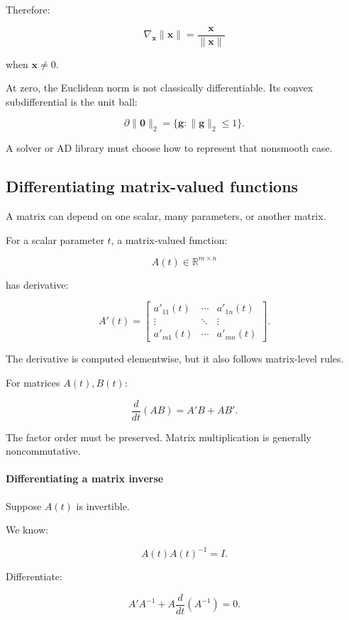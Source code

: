 Therefore:

\[
\boxed{ \nabla_{\mathbf x}\|\mathbf x\| = \frac{\mathbf x}{\|\mathbf x\|} }
\]

when \(\mathbf x\ne0\).

At zero, the Euclidean norm is not classically differentiable. Its convex subdifferential is the unit ball:

\[
\partial\|\mathbf0\|_2= \{\mathbf g:\|\mathbf g\|_2\le1\}.
\]

A solver or AD library must choose how to represent that nonsmooth case.

\subsection{Differentiating matrix-valued functions}\label{02-foundations-ii-ch027-differentiating-matrix-valued-functions}

A matrix can depend on one scalar, many parameters, or another matrix.

For a scalar parameter \(t\), a matrix-valued function:

\[
A(t)\in\mathbb R^{m\times n}
\]

has derivative:

\[
\boxed{ A'(t)= \begin{bmatrix} a'_{11}(t)&\cdots&a'_{1n}(t)\\ \vdots&\ddots&\vdots\\ a'_{m1}(t)&\cdots&a'_{mn}(t) \end{bmatrix} }.
\]

The derivative is computed elementwise, but it also follows matrix-level rules.

For matrices \(A(t),B(t)\):

\[
\boxed{ \frac d{dt}(AB)=A'B+AB' }.
\]

The factor order must be preserved. Matrix multiplication is generally noncommutative.

\paragraph{Differentiating a matrix inverse}\label{02-foundations-ii-ch027-differentiating-a-matrix-inverse}

Suppose \(A(t)\) is invertible.

We know:

\[
A(t)A(t)^{-1}=I.
\]

Differentiate:

\[
A'A^{-1} + A\frac d{dt}(A^{-1}) =0.
\]

